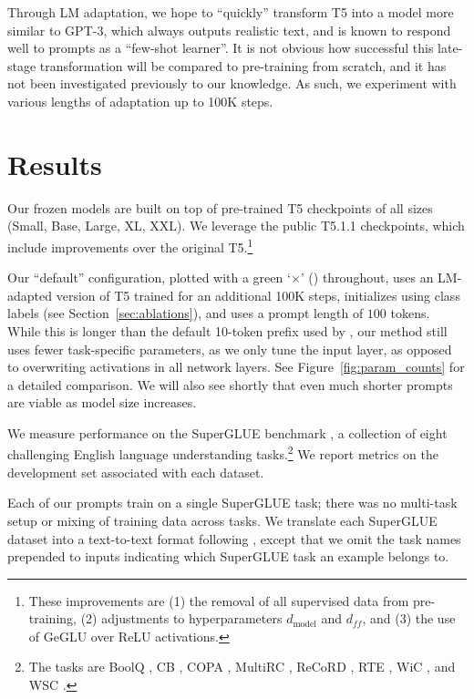 Through LM adaptation, we hope to ``quickly'' transform T5 into a model more similar to \mbox{GPT-3}, which always outputs realistic text, and is known to respond well to prompts as a ``few-shot learner''. It is not obvious how successful this late-stage transformation will be compared to pre-training from scratch, and it has not been investigated previously to our knowledge. As such, we experiment with various lengths of adaptation up to 100K steps.

\section{Results}
\label{sec:results}
Our frozen models are built on top of pre-trained T5 checkpoints of all sizes (Small, Base, Large, XL, XXL). We leverage the public T5.1.1 checkpoints, which include improvements over the original T5.\footnote{These improvements are (1) the removal of all supervised data from pre-training, (2) adjustments to hyperparameters $d_{\text{model}}$ and $d_{f\!f}$, and (3) the use of GeGLU \cite{shazeer2020glu} over ReLU \cite{Nair2010RectifiedLU} activations.}

\label{settings:default}Our ``default'' configuration, plotted with a green `$\times$' () throughout, uses an LM-adapted version of T5 trained for an additional 100K steps, initializes using class labels (see Section~\ref{sec:ablations}), and uses a prompt length of $100$ tokens. While this is longer than the default 10-token prefix used by \citet{li_2021_prefix_tuning}, our method still uses fewer task-specific parameters, as we only tune the input layer, as opposed to overwriting activations in all network layers. See Figure~\ref{fig:param_counts} for a detailed comparison. We will also see shortly that even much shorter prompts are viable as model size increases.

We measure performance on the SuperGLUE benchmark \cite{wang2019superglue}, a collection of eight challenging English language understanding tasks.\footnote{The tasks are BoolQ \cite{clark-etal-2019-boolq}, CB \cite{de-marneff_simons_tonhauser_2019}, COPA \cite{roemmele2011choice}, MultiRC \cite{MultiRC2018}, ReCoRD \cite{zhang2018record}, RTE \cite{dagan2005pascal,bar2006second,giampiccolo2007third,bentivogli2009fifth}, WiC \cite{DBLP:journals/corr/abs-1808-09121}, and WSC \cite{levesque2012winograd}.} We report metrics on the development set associated with each dataset.

Each of our prompts train on a single SuperGLUE task; there was no multi-task setup or mixing of training data across tasks. We translate each SuperGLUE dataset into a text-to-text format following \citet{raffel_2020_t5}, except that we omit the task names prepended to inputs indicating which SuperGLUE task an example belongs to.

